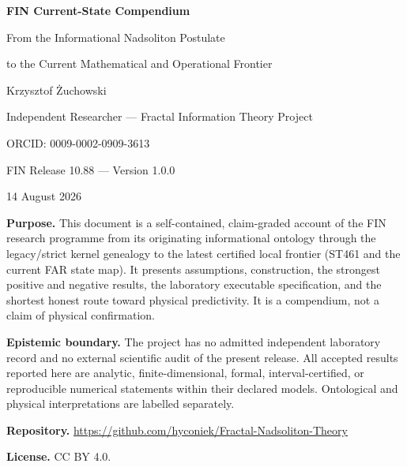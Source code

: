 \documentclass[11pt,a4paper]{article}
\theoremstyle{definition}
\theoremstyle{remark}
\begin{document}
\hypersetup{pageanchor=false}

\begin{titlepage}
\centering
\vspace*{16mm}
{\Huge\bfseries FIN Current-State Compendium\par}
\vspace{5mm}
{\Large From the Informational Nadsoliton Postulate\par}
\vspace{2mm}
{\Large to the Current Mathematical and Operational Frontier\par}
\vspace{14mm}
{\Large Krzysztof Żuchowski\par}
\vspace{2mm}
{\normalsize Independent Researcher --- Fractal Information Theory Project\par}
\vspace{2mm}
{\normalsize ORCID: 0009-0002-0909-3613\par}
\vspace{10mm}
{\large FIN Release 10.88 --- Version 1.0.0\par}
{\large 14 August 2026\par}
\vfill
\begin{minipage}{0.90\textwidth}
\small
\textbf{Purpose.} This document is a self-contained, claim-graded account of the FIN research programme from its originating informational ontology through the legacy/strict kernel genealogy to the latest certified local frontier (ST461 and the current FAR state map). It presents assumptions, construction, the strongest positive and negative results, the laboratory executable specification, and the shortest honest route toward physical predictivity. It is a compendium, not a claim of physical confirmation.

\medskip
\textbf{Epistemic boundary.} The project has no admitted independent laboratory record and no external scientific audit of the present release. All accepted results reported here are analytic, finite-dimensional, formal, interval-certified, or reproducible numerical statements within their declared models. Ontological and physical interpretations are labelled separately.

\medskip
\textbf{Repository.} \url{https://github.com/hyconiek/Fractal-Nadsoliton-Theory}

\textbf{License.} CC BY 4.0.
\end{minipage}
\vfill
\end{titlepage}
\hypersetup{pageanchor=true}
\end{document}
